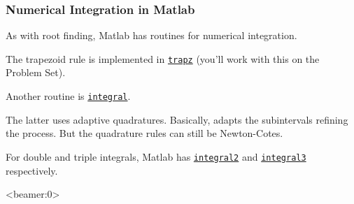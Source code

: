 \documentclass[11pt,xcolor={svgnames},aspectratio=169,usepdftitle=false]{beamer}
\let\toneitemize\itemize
\let\ttwoitemize\enditemize
\renewenvironment{itemize}{\toneitemize\addtolength{\itemsep}{0.7\baselineskip}}{\ttwoitemize}
\begin{document}
\begin{frame}
  \frametitle{Numerical Integration in Matlab}
\begin{itemize}
  \item As with root finding, Matlab has routines for numerical integration.
  \item The trapezoid rule is implemented in \href{https://www.mathworks.com/help/matlab/ref/trapz.html}{\texttt{trapz}} (you'll work with this on the Problem Set).
  \item Another routine is \href{https://www.mathworks.com/help/matlab/ref/integral.html}{\texttt{integral}}.
  \item The latter uses adaptive quadratures. Basically, adapts the subintervals refining the process. But the quadrature rules can still be Newton-Cotes.
  \item For double and triple integrals, Matlab has \href{https://www.mathworks.com/help/matlab/ref/integral2.html}{\texttt{integral2}} and \href{https://www.mathworks.com/help/matlab/ref/integral3.html}{\texttt{integral3}} respectively.
\end{itemize}
\end{frame}

\begin{frame}<beamer:0>
  \nocite{*}
  
  
\end{frame}
\end{document}
